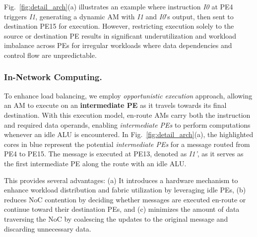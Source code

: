 \begin{comment}
Fig.~\ref{fig:detail_arch}(a) illustrates an example where instruction \textit{I0} at PE4 triggers \textit{I1}, generating a dynamic AM with \textit{I1} and \textit{I0}'s output, which is then sent to destination PE15 for execution. 
However, restricting execution solely to the source or destination PE results in significant underutilization and workload imbalance across PEs, particularly in irregular workloads where data dependencies and control flow are unpredictable.
\end{comment}
Fig.~\ref{fig:detail_arch}(a) illustrates an example where instruction \textit{I0} at PE4 triggers \textit{I1}, generating a dynamic AM with \textit{I1} and \textit{I0}'s output, then sent to destination PE15 for execution.
However, restricting execution solely to the source or destination PE results in significant underutilization and workload imbalance across PEs for irregular workloads where data dependencies and control flow are unpredictable.

\subsubsection{In-Network Computing.}
To enhance load balancing, we employ \textit{opportunistic execution} approach, allowing an AM to execute on an \textbf{intermediate PE} as it travels towards its final destination.
With this execution model, en-route AMs carry both the instruction and required data operands, enabling \textit{intermediate PEs} to perform computations whenever an idle ALU is encountered.
In Fig.~\ref{fig:detail_arch}(a), the highlighted cores in blue represent the potential \textit{intermediate PEs} for a message routed from PE4 to PE15.
The message is executed at PE13, denoted as \textit{I1'}, as it serves as the first intermediate PE along the route with an idle ALU.

This provides several advantages: 
(a) It introduces a hardware mechanism to enhance workload distribution and fabric utilization by leveraging idle PEs,
(b) reduces NoC contention by deciding whether messages are executed en-route or continue toward their destination PEs, and
(c) minimizes the amount of data traversing the NoC by coalescing the updates to the original message and discarding unnecessary data.

